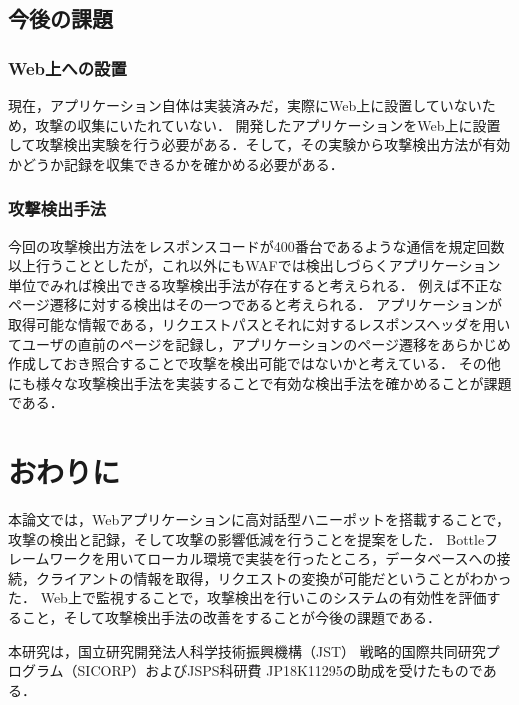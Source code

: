 \documentclass{css}
\begin{document}
\subsection{今後の課題}
\subsubsection{Web上への設置}
現在，アプリケーション自体は実装済みだ，実際にWeb上に設置していないため，攻撃の収集にいたれていない．
開発したアプリケーションをWeb上に設置して攻撃検出実験を行う必要がある．そして，その実験から攻撃検出方法が有効かどうか記録を収集できるかを確かめる必要がある．\par
\subsubsection{攻撃検出手法}
今回の攻撃検出方法をレスポンスコードが400番台であるような通信を規定回数以上行うこととしたが，これ以外にもWAFでは検出しづらくアプリケーション単位でみれば検出できる攻撃検出手法が存在すると考えられる．
例えば不正なページ遷移に対する検出はその一つであると考えられる．
アプリケーションが取得可能な情報である，リクエストパスとそれに対するレスポンスヘッダを用いてユーザの直前のページを記録し，アプリケーションのページ遷移をあらかじめ作成しておき照合することで攻撃を検出可能ではないかと考えている．
その他にも様々な攻撃検出手法を実装することで有効な検出手法を確かめることが課題である．

\section{おわりに}
本論文では，Webアプリケーションに高対話型ハニーポットを搭載することで，攻撃の検出と記録，そして攻撃の影響低減を行うことを提案をした．
Bottleフレームワークを用いてローカル環境で実装を行ったところ，データベースへの接続，クライアントの情報を取得，リクエストの変換が可能だということがわかった．
Web上で監視することで，攻撃検出を行いこのシステムの有効性を評価すること，そして攻撃検出手法の改善をすることが今後の課題である．
\begin{acknowledgment}
本研究は，国立研究開発法人科学技術振興機構（JST） 戦略的国際共同研究プログラム（SICORP）およびJSPS科研費 JP18K11295の助成を受けたものである．
\end{acknowledgment}
\end{document}
